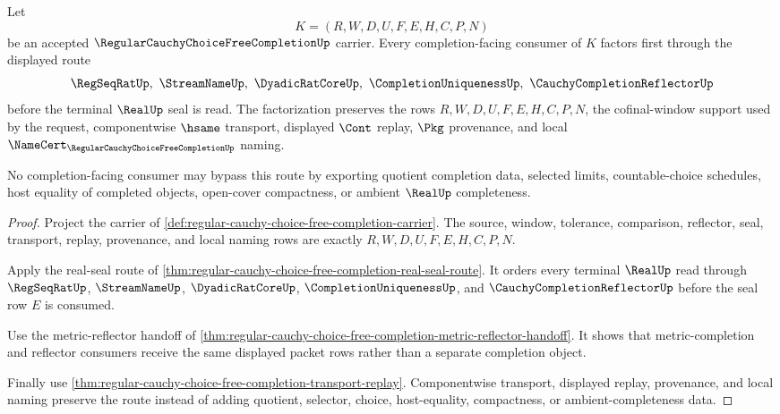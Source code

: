 \begin{theorem}
\label{thm:regular-cauchy-choice-free-completion-reflector-universal-factorization}
Let
$$
K=(R,W,D,U,F,E,H,C,P,N)
$$
be an accepted $\RegularCauchyChoiceFreeCompletionUp$ carrier. Every completion-facing consumer of $K$ factors first through the displayed route
$$
\RegSeqRatUp,\ \StreamNameUp,\ \DyadicRatCoreUp,\ \CompletionUniquenessUp,\ \CauchyCompletionReflectorUp
$$
before the terminal $\RealUp$ seal is read. The factorization preserves the rows $R,W,D,U,F,E,H,C,P,N$, the cofinal-window support used by the request, componentwise $\hsame$ transport, displayed $\Cont$ replay, $\Pkg$ provenance, and local $\NameCert_{\RegularCauchyChoiceFreeCompletionUp}$ naming.

No completion-facing consumer may bypass this route by exporting quotient completion data, selected limits, countable-choice schedules, host equality of completed objects, open-cover compactness, or ambient $\RealUp$ completeness.
\end{theorem}
\begin{proof}
Project the carrier of \autoref{def:regular-cauchy-choice-free-completion-carrier}. The source, window, tolerance, comparison, reflector, seal, transport, replay, provenance, and local naming rows are exactly $R,W,D,U,F,E,H,C,P,N$.

Apply the real-seal route of \autoref{thm:regular-cauchy-choice-free-completion-real-seal-route}. It orders every terminal $\RealUp$ read through $\RegSeqRatUp$, $\StreamNameUp$, $\DyadicRatCoreUp$, $\CompletionUniquenessUp$, and $\CauchyCompletionReflectorUp$ before the seal row $E$ is consumed.

Use the metric-reflector handoff of \autoref{thm:regular-cauchy-choice-free-completion-metric-reflector-handoff}. It shows that metric-completion and reflector consumers receive the same displayed packet rows rather than a separate completion object.

Finally use \autoref{thm:regular-cauchy-choice-free-completion-transport-replay}. Componentwise transport, displayed replay, provenance, and local naming preserve the route instead of adding quotient, selector, choice, host-equality, compactness, or ambient-completeness data.
\end{proof}

